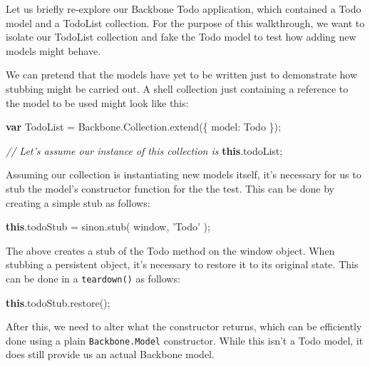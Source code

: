 \documentclass[9pt]{book}
\newenvironment{Shaded}{}{}
\newcommand{\KeywordTok}[1]{\textcolor[rgb]{0.00,0.44,0.13}{\textbf{{#1}}}}
\newcommand{\DataTypeTok}[1]{\textcolor[rgb]{0.56,0.13,0.00}{{#1}}}
\newcommand{\StringTok}[1]{\textcolor[rgb]{0.25,0.44,0.63}{{#1}}}
\newcommand{\CommentTok}[1]{\textcolor[rgb]{0.38,0.63,0.69}{\textit{{#1}}}}
\newcommand{\OtherTok}[1]{\textcolor[rgb]{0.00,0.44,0.13}{{#1}}}
\newcommand{\FunctionTok}[1]{\textcolor[rgb]{0.02,0.16,0.49}{{#1}}}
\newcommand{\NormalTok}[1]{{#1}}
\begin{document}
Let us briefly re-explore our Backbone Todo application, which contained
a Todo model and a TodoList collection. For the purpose of this
walkthrough, we want to isolate our TodoList collection and fake the
Todo model to test how adding new models might behave.

We can pretend that the models have yet to be written just to
demonstrate how stubbing might be carried out. A shell collection just
containing a reference to the model to be used might look like this:

\begin{Shaded}
\begin{Highlighting}[]
\KeywordTok{var} \NormalTok{TodoList = }\OtherTok{Backbone}\NormalTok{.}\OtherTok{Collection}\NormalTok{.}\FunctionTok{extend}\NormalTok{(\{}
    \DataTypeTok{model}\NormalTok{: Todo}
\NormalTok{\});}

\CommentTok{// Let's assume our instance of this collection is}
\KeywordTok{this}\NormalTok{.}\FunctionTok{todoList}\NormalTok{;}
\end{Highlighting}
\end{Shaded}

Assuming our collection is instantiating new models itself, it's
necessary for us to stub the model's constructor function for the the
test. This can be done by creating a simple stub as follows:

\begin{Shaded}
\begin{Highlighting}[]
\KeywordTok{this}\NormalTok{.}\FunctionTok{todoStub} \NormalTok{= }\OtherTok{sinon}\NormalTok{.}\FunctionTok{stub}\NormalTok{( window, }\StringTok{'Todo'} \NormalTok{);}
\end{Highlighting}
\end{Shaded}

The above creates a stub of the Todo method on the window object. When
stubbing a persistent object, it's necessary to restore it to its
original state. This can be done in a \texttt{teardown()} as follows:

\begin{Shaded}
\begin{Highlighting}[]
\KeywordTok{this}\NormalTok{.}\OtherTok{todoStub}\NormalTok{.}\FunctionTok{restore}\NormalTok{();}
\end{Highlighting}
\end{Shaded}

After this, we need to alter what the constructor returns, which can be
efficiently done using a plain \texttt{Backbone.Model} constructor.
While this isn't a Todo model, it does still provide us an actual
Backbone model.
\end{document}
